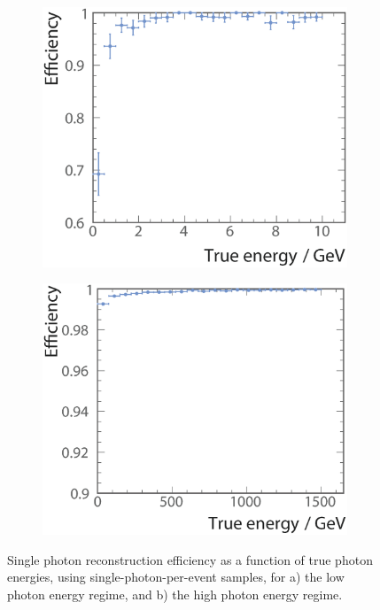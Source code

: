 
\begin{figure}[tbph]
\centering
    \begin{subfigure}[b]{0.45\textwidth}
        \includegraphics[width=\textwidth]{photon/singlePhotonEff3full}
        \caption{}
        \label{fig:photonSingleEffLow}
    \end{subfigure}
    \begin{subfigure}[b]{0.45\textwidth}
        \includegraphics[width=\textwidth]{photon/singlePhotonEff2}
        \caption{}
        \label{fig:photonSingleEff}
    \end{subfigure}
\caption[Single photon reconstruction efficiency as a function of energy.]
{Single photon reconstruction efficiency as a function of true photon energies, using single-photon-per-event samples, for a) the low photon energy regime, and b) the high photon energy regime.}
\label{fig:photonSingleEffPerformance}
\end{figure}

